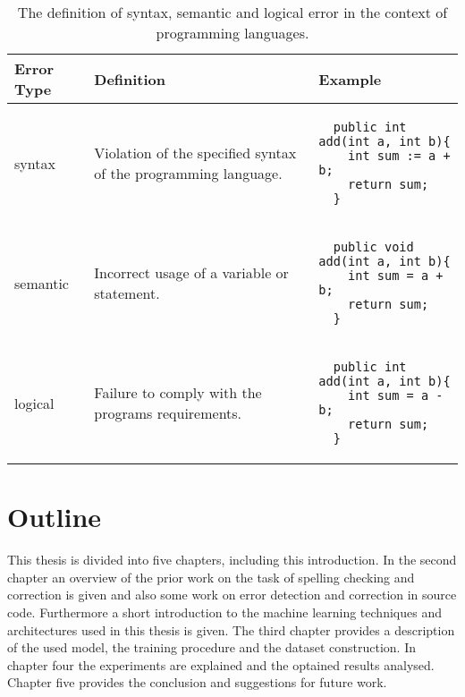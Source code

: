 \begin{table}[t]
\begin{tabular}{ | m{2cm}  m{35mm}  m{55mm} | }
  \hline
  Error Type & Definition & Example \\
  \hline
  syntax &
  Violation of the specified syntax of the programming language. &
  \begin{lstlisting}
  public int add(int a, int b){
    int sum := a + b;
    return sum;
  }
  \end{lstlisting}
  \\
  semantic &
  Incorrect usage of a variable or statement. &
  \begin{lstlisting}
  public void add(int a, int b){
    int sum = a + b;
    return sum;
  }
  \end{lstlisting}
  \\
  logical &
  Failure to comply with the programs requirements. &
  \begin{lstlisting}
  public int add(int a, int b){
    int sum = a - b;
    return sum;
  }
  \end{lstlisting}
  \\
  \hline
\end{tabular}
\caption{The definition of syntax, semantic and logical error in the context of programming languages.}
\label{error_table}
\end{table}

\section{Outline}

This thesis is divided into five chapters, including this introduction. In the second chapter an overview of the prior work on the task of spelling checking and correction is given and also some work on error detection and correction in source code. Furthermore a short introduction to the machine learning techniques and architectures used in this thesis is given. The third chapter provides a description of the used model, the training procedure and the dataset construction. In chapter four the experiments are explained and the optained results analysed. Chapter five provides the conclusion and suggestions for future work.
